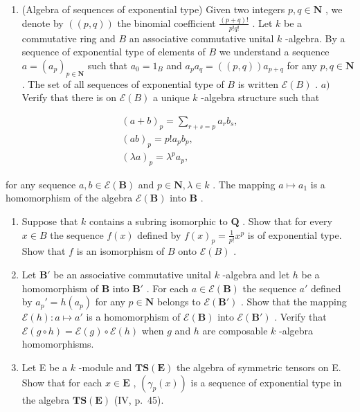 \BourbakiExerciseGroup

\begin{enumerate}
\def\labelenumi{\arabic{enumi})}
\tightlist
\item
  (Algebra of sequences of exponential type) Given two integers \(p, q \in \mathbf{N}\) , we denote by \(((p, q))\) the binomial coefficient \(\frac{(p + q)!}{p!q!}\) . Let \(k\) be a commutative ring and \(B\) an associative commutative unital \(k\) -algebra. By a sequence of exponential type of elements of \(B\) we understand a sequence \(a = (a_p)_{p \in \mathbf{N}}\) such that \(a_0 = 1_B\) and \(a_p a_q = ((p, q)) a_{p + q}\) for any \(p, q \in \mathbf{N}\) . The set of all sequences of exponential type of \(B\) is written \(\mathcal{E}(B)\) . \(a)\) Verify that there is on \(\mathcal{E}(B)\) a unique \(k\) -algebra structure such that
\end{enumerate}

\[
\begin{array}{c} (a + b) _ {p} = \sum_ {r + s = p} a _ {r} b _ {s}, \\ (a b) _ {p} = p! a _ {p} b _ {p}, \\ (\lambda a) _ {p} = \lambda^ {p} a _ {p}, \end{array}
\]

for any sequence \(a, b \in \mathcal{E}(\mathbf{B})\) and \(p \in \mathbf{N}, \lambda \in k\) . The mapping \(a \mapsto a_1\) is a homomorphism of the algebra \(\mathcal{E}(\mathbf{B})\) into \(\mathbf{B}\) .

\begin{enumerate}
\def\labelenumi{\alph{enumi})}
\setcounter{enumi}{1}
\item
  Suppose that \(k\) contains a subring isomorphic to \(\mathbf{Q}\) . Show that for every \(x \in B\) the sequence \(f(x)\) defined by \(f(x)_p = \frac{1}{p!} x^p\) is of exponential type. Show that \(f\) is an isomorphism of \(B\) onto \(\mathcal{E}(B)\) .
\item
  Let \(\mathbf{B}'\) be an associative commutative unital \(k\) -algebra and let \(h\) be a homomorphism of \(\mathbf{B}\) into \(\mathbf{B}'\) . For each \(a \in \mathcal{E}(\mathbf{B})\) the sequence \(a'\) defined by \(a_p' = h(a_p)\) for any \(p \in \mathbf{N}\) belongs to \(\mathcal{E}(\mathbf{B}')\) . Show that the mapping \(\mathcal{E}(h): a \mapsto a'\) is a homomorphism of \(\mathcal{E}(\mathbf{B})\) into \(\mathcal{E}(\mathbf{B}')\) . Verify that \(\mathcal{E}(g \circ h) = \mathcal{E}(g) \circ \mathcal{E}(h)\) when \(g\) and \(h\) are composable \(k\) -algebra homomorphisms.
\item
  Let E be a \(k\) -module and \(\mathbf{TS}(\mathbf{E})\) the algebra of symmetric tensors on E. Show that for each \(x \in \mathbf{E}\) , \((\gamma_p(x))\) is a sequence of exponential type in the algebra \(\mathbf{TS}(\mathbf{E})\) (IV, p.~45).
\end{enumerate}

